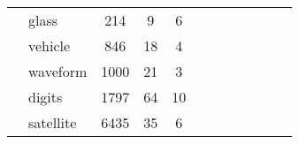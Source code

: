 \begin{tabular}{l l c c c C{0.6\tblw} C{0.6\tblw}  C{0.6\tblw}  C{0.6\tblw} C{0.6\tblw}  C{0.6\tblw}  C{0.6\tblw}}
& \sc glass & 214 & 9 & 6 &  &  &  &  \\
& \sc vehicle & 846 & 18 & 4 &  &  &  &  \\
& \sc waveform & 1000 & 21 & 3 &  &  &  &  \\
& \sc digits & 1797 & 64 & 10 &  &  &  &  \\
& \sc satellite & 6435 & 35 & 6 &  &  &  &  \\
\bottomrule
\end{tabular}
